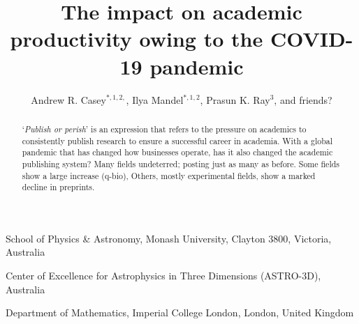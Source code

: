 \documentclass{nature}
\title{The impact on academic productivity owing to the COVID-19 pandemic}
\author{Andrew R. Casey$^{\ast,1,2,}$,
        Ilya Mandel$^{\ast,1,2}$,
        Prasun K. Ray$^{3}$, 
        and friends?
}
\newcommand{\todo}[1]{\textcolor{gray}{#1}}
\begin{document}

\maketitle

\begin{affiliations}
	\item School of Physics \& Astronomy, Monash University, Clayton 3800, Victoria, Australia
	\item Center of Excellence for Astrophysics in Three Dimensions (ASTRO-3D), Australia
	\item Department of Mathematics, Imperial College London, London, United Kingdom
\end{affiliations}

\begin{abstract}
	`\emph{Publish or perish}' is an expression that refers to the pressure on academics to consistently publish research to ensure a successful career in academia.
	With a global pandemic that has changed how businesses operate, has it also changed the academic publishing system?
	Many fields undeterred; posting just as many as before.
	Some fields show a large increase (q-bio),
	Others, mostly experimental fields, show a marked decline in preprints.
	
\end{abstract}
\end{document}
